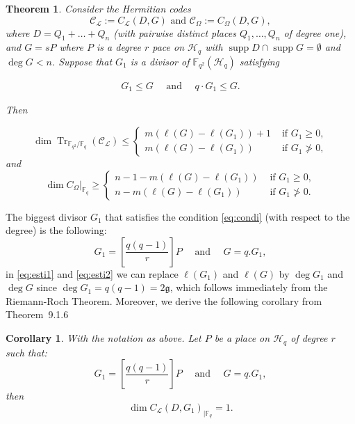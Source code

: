 \documentclass[a4paper]{amsart}
\theoremstyle{plain}
\newtheorem{theorem}{Theorem}[section]
\newtheorem*{corollary}{Corollary}
\theoremstyle{definition}
\theoremstyle{remark}
\DeclareMathOperator{\trace}{Tr}
\newcommand{\calL}{\mathcal{L}}
\newcommand{\calC}{\mathcal{C}}
\begin{document}
\begin{theorem}

	Consider the Hermitian codes
	\[\calC_{\calL}:= C_{\calL}(D,G) \text{ and } \calC_{\Omega}:=C_{\Omega}(D,G),\]
	where $D=Q_1+\ldots+Q_n$ (with pairwise distinct places $Q_1, \ldots, Q_n$ of degree one), and $G=sP$ where $P$ is a degree $r$ pace on $\mathscr{H}_q$ with $\operatorname{supp} D \cap \operatorname{supp} G=\emptyset$ and $\deg G<n$. Suppose that $G_1$ is a divisor of $\mathbb{F}_{q^2}(\mathscr{H}_q)$ satisfying
	
	\begin{align}
		G_1 \leq G \quad \text { and } \quad q \cdot G_1 \leq G . \label{eq:condi}
	\end{align}
	
	Then
	
	\begin{equation}\label{eq:esti1}
		\dim \trace_{\mathbb{F}_{q^2} / \mathbb{F}_q}\left(\calC_{\mathcal{L}}\right) \leq \begin{cases}m\left(\ell(G)-\ell\left(G_1\right)\right)+1 & \text { if } G_1 \geq 0, \\ m\left(\ell(G)-\ell\left(G_1\right)\right) & \text { if } G_1 \ngtr 0,\end{cases}
	\end{equation}
	and
	\begin{equation}\label{eq:esti2}
		\left.\dim C_{\Omega}\right|_{\mathbb{F}_q} \geq \begin{cases}n-1-m\left(\ell(G)-\ell\left(G_1\right)\right) & \text { if } G_1 \geq 0, \\ n-m\left(\ell(G)-\ell\left(G_1\right)\right) & \text { if } G_1 \ngtr 0 .\end{cases}
	\end{equation}
	
\end{theorem}

The biggest divisor $G_1$ that satisfies the condition \eqref{eq:condi} (with respect to the degree) is the following:
\[G_1= \left[ \frac{q(q-1)}{r}\right]P \quad \text{ and } \quad  G=q.G_1, \]
in \eqref{eq:esti1} and \eqref{eq:esti2} we can replace $\ell (G_1)$ and $\ell(G)$ by $\deg G_1$ and $\deg G$ since $\deg G_1= q(q-1)=2\mathfrak{g}$, which  follows immediately from the Riemann-Roch Theorem.
Moreover, we derive the following corollary from Theorem~9.1.6~\cite{stichtenoth2009algebraic}

\begin{corollary}\label{coroll}
	With the notation as above. Let $P$ be a place on $\mathscr{H}_q$ of degree $r$ such that:
	\[G_1= \left[ \frac{q(q-1)}{r}\right]P \quad \text{ and } \quad  G=q.G_1, \]
	then 
	\[\dim C_{\mathcal{L}}(D,G_1)_{\mid \mathbb{F}_q}= 1.\]
\end{corollary}
\end{document}
